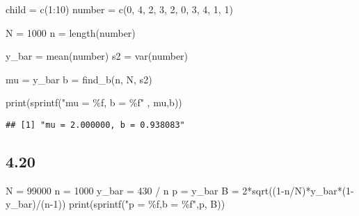 \documentclass[
]{article}
\newenvironment{Shaded}{\begin{snugshade}}{\end{snugshade}}
\newcommand{\DecValTok}[1]{\textcolor[rgb]{0.00,0.00,0.81}{#1}}
\newcommand{\FunctionTok}[1]{\textcolor[rgb]{0.00,0.00,0.00}{#1}}
\newcommand{\NormalTok}[1]{#1}
\newcommand{\OtherTok}[1]{\textcolor[rgb]{0.56,0.35,0.01}{#1}}
\newcommand{\SpecialCharTok}[1]{\textcolor[rgb]{0.00,0.00,0.00}{#1}}
\newcommand{\StringTok}[1]{\textcolor[rgb]{0.31,0.60,0.02}{#1}}
\begin{document}
\begin{Shaded}
\begin{Highlighting}[]
\NormalTok{child }\OtherTok{=} \FunctionTok{c}\NormalTok{(}\DecValTok{1}\SpecialCharTok{:}\DecValTok{10}\NormalTok{)}
\NormalTok{number }\OtherTok{=} \FunctionTok{c}\NormalTok{(}\DecValTok{0}\NormalTok{, }\DecValTok{4}\NormalTok{, }\DecValTok{2}\NormalTok{, }\DecValTok{3}\NormalTok{, }\DecValTok{2}\NormalTok{, }\DecValTok{0}\NormalTok{, }\DecValTok{3}\NormalTok{, }\DecValTok{4}\NormalTok{, }\DecValTok{1}\NormalTok{, }\DecValTok{1}\NormalTok{)}

\NormalTok{N }\OtherTok{=} \DecValTok{1000}
\NormalTok{n }\OtherTok{=} \FunctionTok{length}\NormalTok{(number)}

\NormalTok{y\_bar }\OtherTok{=} \FunctionTok{mean}\NormalTok{(number)}
\NormalTok{s2 }\OtherTok{=} \FunctionTok{var}\NormalTok{(number)}

\NormalTok{mu }\OtherTok{=}\NormalTok{ y\_bar}
\NormalTok{b }\OtherTok{=} \FunctionTok{find\_b}\NormalTok{(n, N, s2)}

\FunctionTok{print}\NormalTok{(}\FunctionTok{sprintf}\NormalTok{(}\StringTok{"mu = \%f, b = \%f"}\NormalTok{ , mu,b))}
\end{Highlighting}
\end{Shaded}

\begin{verbatim}
## [1] "mu = 2.000000, b = 0.938083"
\end{verbatim}

\hypertarget{section-8}{%
\subsection{4.20}\label{section-8}}

\begin{Shaded}
\begin{Highlighting}[]
\NormalTok{N }\OtherTok{=} \DecValTok{99000}
\NormalTok{n }\OtherTok{=} \DecValTok{1000}
\NormalTok{y\_bar }\OtherTok{=} \DecValTok{430} \SpecialCharTok{/}\NormalTok{ n}
\NormalTok{p }\OtherTok{=}\NormalTok{ y\_bar}
\NormalTok{B }\OtherTok{=} \DecValTok{2}\SpecialCharTok{*}\FunctionTok{sqrt}\NormalTok{((}\DecValTok{1}\SpecialCharTok{{-}}\NormalTok{n}\SpecialCharTok{/}\NormalTok{N)}\SpecialCharTok{*}\NormalTok{y\_bar}\SpecialCharTok{*}\NormalTok{(}\DecValTok{1}\SpecialCharTok{{-}}\NormalTok{y\_bar)}\SpecialCharTok{/}\NormalTok{(n}\DecValTok{{-}1}\NormalTok{))}
\FunctionTok{print}\NormalTok{(}\FunctionTok{sprintf}\NormalTok{(}\StringTok{"p = \%f,b = \%f"}\NormalTok{,p, B))}
\end{Highlighting}
\end{Shaded}
\end{document}
